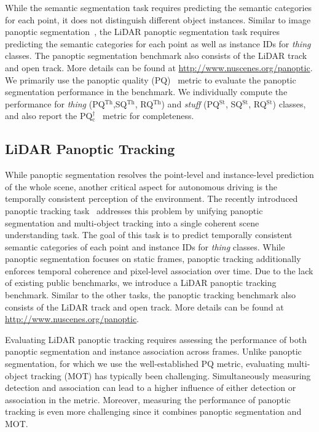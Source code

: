 \documentclass[letterpaper, 10 pt, journal, twoside]{IEEEtran}
\begin{document}
While the semantic segmentation task requires predicting the semantic categories for each point, it does not distinguish different object instances. Similar to image panoptic segmentation~\cite{kirillov2019panoptic}, the LiDAR panoptic segmentation task requires predicting the semantic categories for each point as well as instance IDs for \emph{thing} classes. The panoptic segmentation benchmark also consists of the LiDAR track and open track. More details can be found at \url{http://www.nuscenes.org/panoptic}. We primarily use the panoptic quality (PQ)~\cite{kirillov2019panoptic} metric to evaluate the panoptic segmentation performance in the benchmark. We individually compute the performance for \emph{thing} (PQ$^{\text{Th}}$,SQ$^{\text{Th}}$, RQ$^{\text{Th}}$) and \emph{stuff} (PQ$^{\text{St}}$, SQ$^{\text{St}}$, RQ$^{\text{St}}$) classes, and also report the PQ$^\dagger_\text{c}$~\cite{porzi2019seamless} metric for completeness. 

\subsection{LiDAR Panoptic Tracking}
\label{sec:panoptic_tracking}
While panoptic segmentation resolves the point-level and instance-level prediction of the whole scene, another critical aspect for autonomous driving is the temporally consistent perception of the environment. The recently introduced panoptic tracking task~\cite{hurtado2020mopt} addresses this problem by unifying panoptic segmentation and multi-object tracking into a single coherent scene understanding task. The goal of this task is to predict temporally consistent semantic categories of each point and instance IDs for \emph{thing} classes. While panoptic segmentation focuses on static frames, panoptic tracking additionally enforces temporal coherence and pixel-level association over time. Due to the lack of existing public benchmarks, we introduce a LiDAR panoptic tracking benchmark. Similar to the other tasks, the panoptic tracking benchmark also consists of the LiDAR track and open track. More details can be found at \url{http://www.nuscenes.org/panoptic}.

Evaluating LiDAR panoptic tracking requires assessing the performance of both panoptic segmentation and instance association across frames. Unlike panoptic segmentation, for which we use the well-established PQ metric, evaluating multi-object tracking (MOT) has typically been challenging. Simultaneously measuring detection and association can lead to a higher influence of either detection or association in the metric. Moreover, measuring the performance of panoptic tracking is even more challenging since it combines panoptic segmentation and MOT.
\end{document}
